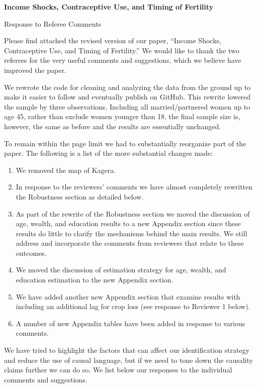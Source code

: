 \documentclass[letterpaper,12pt]{article}
\title{} \author{}
\begin{document}
\begin{center} \textbf{\large Income Shocks, Contraceptive Use, and
Timing of Fertility} \end{center}

\begin{center} Response to Referee Comments \end{center}

\noindent Please find attached the revised version of our paper,
``Income Shocks, Contraceptive Use, and Timing of Fertility.''
We would like to thank the two referees for the very useful comments and
suggestions,
which we believe have improved the paper.

We rewrote the code for cleaning and analyzing the data from the ground up 
to make it easier to follow and eventually publish on GitHub.
This rewrite lowered the sample by three observations.
Including all married/partnered women up to age 45, rather than exclude
women younger than 18, the final sample size is, however, the same as 
before and the results are essentially unchanged.

To remain within the page limit we had to substantially reorganize
part of the paper.
The following is a list of the more substantial changes made:
\begin{enumerate}
\item We removed the map of Kagera.
\item In response to the reviewers' comments we have almost completely
rewritten the Robustness section as detailed below.
\item As part of the rewrite of the Robustness section we moved 
the discussion of age, wealth, and education results to a new Appendix
section since these results do little to clarify the mechanisms 
behind the main results.
We still address and incorporate the comments from reviewers that
relate to these outcomes.
\item We moved the discussion of estimation strategy for age,
wealth, and education estimation to the new Appendix section.
\item We have added another new Appendix section that examine results 
with including an additional lag for crop loss (see response to
Reviewer 1 below).
\item A number of new Appendix tables have been added in response
to various comments.
\end{enumerate}

We have tried to highlight the factors that can affect our identification 
strategy and reduce the use of causal language, but if we need to tone down 
the causality claims further we can do so.
We list below our responses to the individual comments and suggestions.
\end{document}
